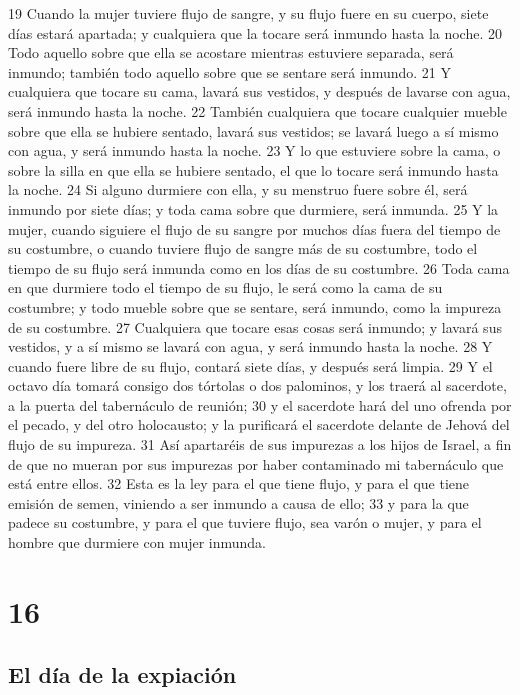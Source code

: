 19 Cuando la mujer tuviere flujo de sangre, y su flujo fuere en su cuerpo, siete días estará apartada; y cualquiera que la tocare será inmundo hasta la noche.
20 Todo aquello sobre que ella se acostare mientras estuviere separada, será inmundo; también todo aquello sobre que se sentare será inmundo.
21 Y cualquiera que tocare su cama, lavará sus vestidos, y después de lavarse con agua, será inmundo hasta la noche.
22 También cualquiera que tocare cualquier mueble sobre que ella se hubiere sentado, lavará sus vestidos; se lavará luego a sí mismo con agua, y será inmundo hasta la noche.
23 Y lo que estuviere sobre la cama, o sobre la silla en que ella se hubiere sentado, el que lo tocare será inmundo hasta la noche.
24 Si alguno durmiere con ella, y su menstruo fuere sobre él, será inmundo por siete días; y toda cama sobre que durmiere, será inmunda.
25 Y la mujer, cuando siguiere el flujo de su sangre por muchos días fuera del tiempo de su costumbre, o cuando tuviere flujo de sangre más de su costumbre, todo el tiempo de su flujo será inmunda como en los días de su costumbre.
26 Toda cama en que durmiere todo el tiempo de su flujo, le será como la cama de su costumbre; y todo mueble sobre que se sentare, será inmundo, como la impureza de su costumbre.
27 Cualquiera que tocare esas cosas será inmundo; y lavará sus vestidos, y a sí mismo se lavará con agua, y será inmundo hasta la noche.
28 Y cuando fuere libre de su flujo, contará siete días, y después será limpia.
29 Y el octavo día tomará consigo dos tórtolas o dos palominos, y los traerá al sacerdote, a la puerta del tabernáculo de reunión;
30 y el sacerdote hará del uno ofrenda por el pecado, y del otro holocausto; y la purificará el sacerdote delante de Jehová del flujo de su impureza.
31 Así apartaréis de sus impurezas a los hijos de Israel, a fin de que no mueran por sus impurezas por haber contaminado mi tabernáculo que está entre ellos.
32 Esta es la ley para el que tiene flujo, y para el que tiene emisión de semen, viniendo a ser inmundo a causa de ello;
33 y para la que padece su costumbre, y para el que tuviere flujo, sea varón o mujer, y para el hombre que durmiere con mujer inmunda.

\chapter{16}

\section*{El día de la expiación}

